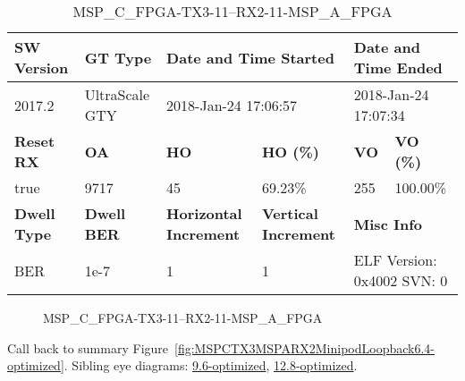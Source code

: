\begin{table}[h]
\centering
\caption{MSP\_C\_FPGA-TX3-11--RX2-11-MSP\_A\_FPGA}
\label{tab:MSPCFPGATX311RX211MSPAFPGA6.4-optimized}
\begin{tabular}{@{}|l|l|l|l|l|l|@{}}
\toprule
\textbf{SW Version}                & \textbf{GT Type}   & \multicolumn{2}{l|}{\textbf{Date and Time Started}}            & \multicolumn{2}{l|}{\textbf{Date and Time Ended}}        \\ \midrule
2017.2                       & UltraScale GTY          & \multicolumn{2}{l|}{2018-Jan-24 17:06:57}                   & \multicolumn{2}{l|}{2018-Jan-24 17:07:34}               \\ \midrule
\textbf{Reset RX}                  & \textbf{OA} & \textbf{HO}   & \textbf{HO (\%)} & \textbf{VO} & \textbf{VO (\%)} \\ \midrule
true & 9717        & 45          & 69.23\%        & 255        & 100.00\%       \\ \midrule
\textbf{Dwell Type}                & \textbf{Dwell BER} & \textbf{Horizontal Increment} & \textbf{Vertical Increment}    & \multicolumn{2}{l|}{\textbf{Misc Info}}                  \\ \midrule
BER                            & 1e-7        & 1        & 1           & \multicolumn{2}{l|}{ELF Version: 0x4002 SVN: 0}                         \\ \bottomrule
\end{tabular}
\end{table}

\begin{figure}[h]
\caption{MSP\_C\_FPGA-TX3-11--RX2-11-MSP\_A\_FPGA} \label{fig:MSPCFPGATX311RX211MSPAFPGA6.4-optimized}
\end{figure}

Call back to summary Figure~\ref{fig:MSPCTX3MSPARX2MinipodLoopback6.4-optimized}.
Sibling eye diagrams: \hyperref[sec:MSPCFPGATX311RX211MSPAFPGA9.6-optimized]{9.6-optimized}, \hyperref[sec:MSPCFPGATX311RX211MSPAFPGA12.8-optimized]{12.8-optimized}.

\clearpage
\newpage

